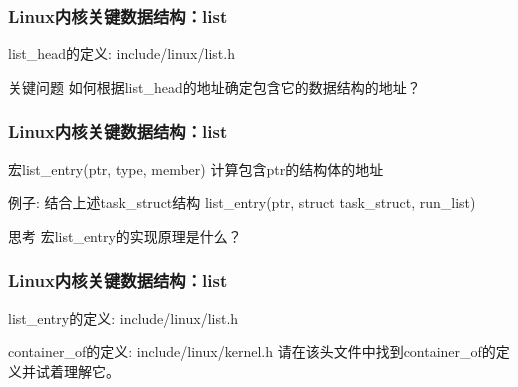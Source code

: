 \documentclass[xcolor=svgnames]{beamer}
\begin{document}
\begin{CJK*}{UTF8}{gbsn}
\begin{frame}[fragile]%
\frametitle{Linux内核关键数据结构：list}
\begin{block}{list\_head的定义: include/linux/list.h}
\lstlisthead
\end{block}
\begin{block}{关键问题}
如何根据list\_head的地址确定包含它的数据结构的地址？
\end{block}
\end{frame}

\begin{frame}[fragile]%
\frametitle{Linux内核关键数据结构：list}
\begin{block}{宏list\_entry(ptr, type, member)}
计算包含ptr的结构体的地址
\end{block}
\begin{block}{例子: 结合上述task\_struct结构}
list\_entry(ptr, struct task\_struct, run\_list)
\end{block}

\begin{block}{思考}
宏list\_entry的实现原理是什么？
\end{block}

\end{frame}

\begin{frame}[fragile]
\frametitle{Linux内核关键数据结构：list}
\begin{block}{list\_entry的定义: include/linux/list.h}
\lstcontainerof
\end{block}
\begin{block}{container\_of的定义: include/linux/kernel.h}
请在该头文件中找到container\_of的定义并试着理解它。
\end{block}
\end{frame}


\end{CJK*}
\end{document}

